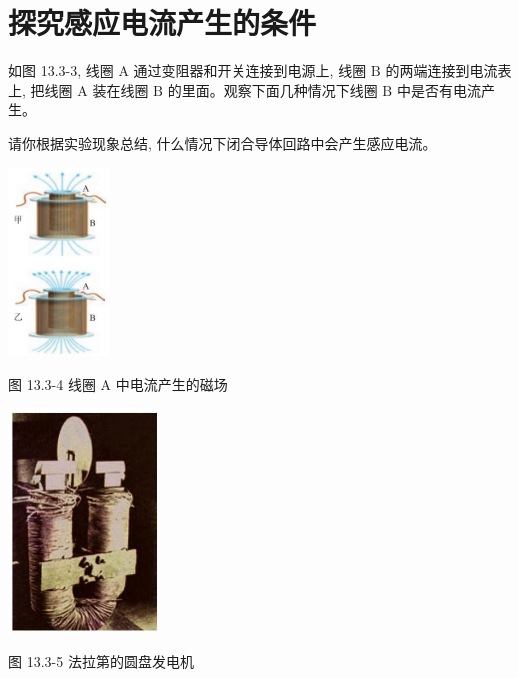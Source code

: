 \documentclass[10pt]{article}
\begin{document}
\section*{探究感应电流产生的条件}

如图 13.3-3, 线圈 A 通过变阻器和开关连接到电源上, 线圈 \(\mathrm{B}\) 的两端连接到电流表上, 把线圈 A 装在线圈 \(\mathrm{B}\) 的里面。观察下面几种情况下线圈 \(\mathrm{B}\) 中是否有电流产生。

\begin{center}
\end{center}

请你根据实验现象总结, 什么情况下闭合导体回路中会产生感应电流。

\begin{mdframed}

\begin{center}
\includegraphics[max width=0.2\textwidth]{images/01911d5f-8e38-70c0-b5b8-2b399bd115b6_121_366339.jpg}
\end{center}

图 13.3-4 线圈 \(\mathrm{A}\) 中电流产生的磁场

\begin{center}
\includegraphics[max width=0.3\textwidth]{images/01911d5f-8e38-70c0-b5b8-2b399bd115b6_121_411187.jpg}
\end{center}

图 13.3-5 法拉第的圆盘发电机

\end{mdframed}
\end{document}
